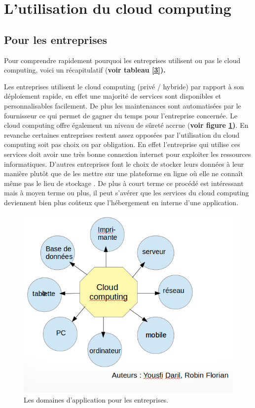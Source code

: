 \documentclass[a4 paper, 12 pt]{article}
\begin{document}
\section{ L’utilisation du cloud computing }
 \subsection{Pour les entreprises}
 
 Pour comprendre rapidement pourquoi les entreprises utilisent ou pas le cloud computing, voici un récapitulatif (\textbf {voir tableau \ref{3}).}
 \newline
 
 Les entreprises utilisent le cloud computing (privé / hybride) par rapport à son déploiement rapide, en effet une majorité de services sont disponibles et personnalisables facilement. De plus les maintenances sont automatisées par le fournisseur ce qui permet de gagner du temps pour l’entreprise concernée. Le cloud computing offre également un niveau de sûreté accrue (\textbf {voir figure \ref{4})}. En revanche certaines entreprises restent assez opposées par l’utilisation du cloud computing soit pas choix ou par obligation. En effet l’entreprise qui utilise ces services doit avoir une très bonne connexion internet pour exploiter les ressources informatiques. D’autres entreprises font le choix de stocker leurs données à leur manière plutôt que de les mettre sur une plateforme en ligne où elle ne connaît même pas le lieu de stockage \cite{chaoui2016entreprise}. De plus à court terme ce procédé est intéressant mais à moyen terme ou plus, il peut s’avérer que les services du cloud computing deviennent bien plus coûteux que l’hébergement en interne d’une application.
 
 \begin{figure} [h]
\includegraphics[scale=0.7]{schemaCreer.png}
\caption{Les domaines d'application pour les entreprises.}
\label{4}
\end{figure}
 
\end{document}
